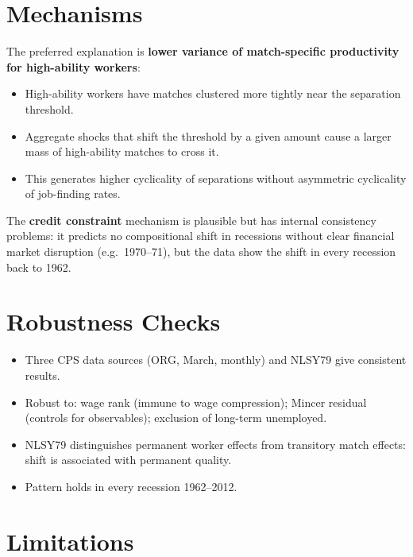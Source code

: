 \section{Mechanisms}

The preferred explanation is \textbf{lower variance of match-specific
productivity for high-ability workers}:
\begin{itemize}
  \item High-ability workers have matches clustered more tightly near the
    separation threshold.
  \item Aggregate shocks that shift the threshold by a given amount cause
    a larger mass of high-ability matches to cross it.
  \item This generates higher cyclicality of separations without asymmetric
    cyclicality of job-finding rates.
\end{itemize}

The \textbf{credit constraint} mechanism is plausible but has internal
consistency problems: it predicts no compositional shift in recessions without
clear financial market disruption (e.g.\ 1970--71), but the data show the
shift in every recession back to 1962.

\section{Robustness Checks}

\begin{itemize}
  \item Three CPS data sources (ORG, March, monthly) and NLSY79 give
    consistent results.
  \item Robust to: wage rank (immune to wage compression); Mincer residual
    (controls for observables); exclusion of long-term unemployed.
  \item NLSY79 distinguishes permanent worker effects from transitory match
    effects: shift is associated with permanent quality.
  \item Pattern holds in every recession 1962--2012.
\end{itemize}

\section{Limitations}

